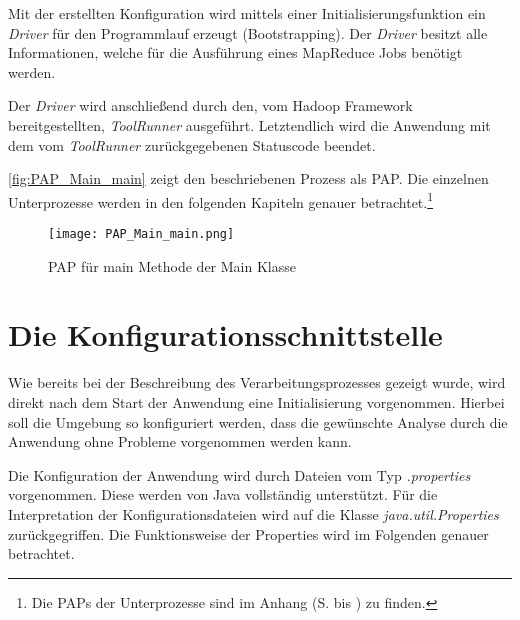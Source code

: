 Mit der erstellten Konfiguration wird mittels einer Initialisierungsfunktion ein \textit{Driver} für den Programmlauf erzeugt (\gls{Bootstrapping}). Der \textit{Driver} besitzt alle Informationen, welche für die Ausführung eines MapReduce Jobs benötigt werden.

Der \textit{Driver} wird anschließend durch den, vom Hadoop Framework bereitgestellten, \textit{ToolRunner} ausgeführt. Letztendlich wird die Anwendung mit dem vom \textit{ToolRunner} zurückgegebenen Statuscode beendet.

\autoref{fig:PAP_Main_main} zeigt den beschriebenen Prozess als \ac{PAP}. Die einzelnen Unterprozesse werden in den folgenden Kapiteln genauer betrachtet.\footnote{Die \acp{PAP} der Unterprozesse sind im Anhang (S. \pageref{subsec:PAPMainMain} bis \pageref{subsec:PAPDriverRun}) zu finden.}

\begin{figure}[h]
	\centering
	\texttt{[image: PAP\_Main\_main.png]}
	\caption{PAP für main Methode der Main Klasse}
	\label{fig:PAP_Main_main}
\end{figure}


\section{Die Konfigurationsschnittstelle}
Wie bereits bei der Beschreibung des Verarbeitungsprozesses gezeigt wurde, wird direkt nach dem Start der Anwendung eine Initialisierung vorgenommen. Hierbei soll die Umgebung so konfiguriert werden, dass die gewünschte Analyse durch die Anwendung ohne Probleme vorgenommen werden kann.

Die Konfiguration der Anwendung wird durch Dateien vom Typ \textit{.properties} vorgenommen. Diese werden von Java vollständig unterstützt. Für die Interpretation der Konfigurationsdateien wird auf die Klasse \textit{java.util.Properties} zurückgegriffen. Die Funktionsweise der Properties wird im Folgenden genauer betrachtet.


